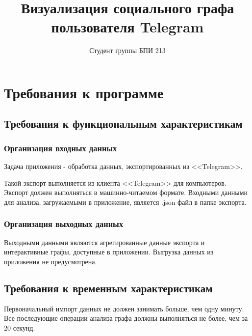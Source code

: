 \documentclass{TechDoc}
\title{Визуализация социального графа пользователя Telegram}
\author{Студент группы БПИ 213}{Н. А. Бирюлин}
\begin{document}
    \maketitle
    
    \tableofcontents
    
    

    
    
    

    \section{Требования к программе}
    
    \subsection{Требования к функциональным характеристикам}
    
    

    \subsubsection{Организация входных данных}

    Задача приложения - обработка данных, экспортированных из <<Telegram>>.

    Такой экспорт выполняется из клиента <<Telegram>> для компьютеров. Экспорт должен выполняться в машинно-читаемом формате. Входными данными для анализа, загружаемыми в приложение, является .json файл в папке экспорта.

    \subsubsection{Организация выходных данных}
    
    Выходными данными являются агрегированные данные экспорта и интерактивные графы, доступные в приложении. Выгрузка данных из приложения не предусмотрена.
        
    \subsection{Требования к временным характеристикам}

    Первоначальный импорт данных не должен занимать больше, чем одну минуту. Все последующие операции анализа графа должны выполняться не более, чем за 20 секунд.
\end{document}
